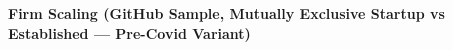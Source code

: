 \documentclass{article}
\begin{document}
\thispagestyle{empty}

\begin{table}[h!]
\caption{\textbf{Firm Scaling (GitHub Sample, Mutually Exclusive Startup vs Established — Pre-Covid Variant)}}

\end{table}
\end{document}
